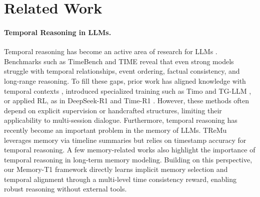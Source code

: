 \documentclass{article} %
\begin{document}
\section{Related Work}
\paragraph{Temporal Reasoning in LLMs.} Temporal reasoning has become an active area of research for LLMs \citep{song-etal-2025-temporal, wei2025time, liu2025time}. Benchmarks such as TimeBench \citep{chu-etal-2024-timebench} and TIME \citep{wei2025time} reveal that even strong models struggle with temporal relationships, event ordering, factual consistency, and long-range reasoning. To fill these gaps, prior work has aligned knowledge with temporal contexts \citep{zhao-etal-2024-set}, introduced specialized training such as Timo \citep{su2024timo} and TG-LLM \citep{xiong-etal-2024-large}, or applied RL, as in DeepSeek-R1 \citep{guo2025deepseek} and Time-R1 \citep{liu2025time}. However, these methods often depend on explicit supervision or handcrafted structures, limiting their applicability to multi-session dialogue. Furthermore, temporal reasoning has recently become an important problem in the memory of LLMs. TReMu \citep{ge2025tremu} leverages memory via timeline summaries but relies on timestamp accuracy for temporal reasoning. A few memory-related works \citep{mai2025agent,du2025rethinking} also highlight the importance of temporal reasoning in long-term memory modeling. Building on this perspective, our Memory-T1 framework directly learns implicit memory selection and temporal alignment through a multi-level time consistency reward, enabling robust reasoning without external tools.
\end{document}
